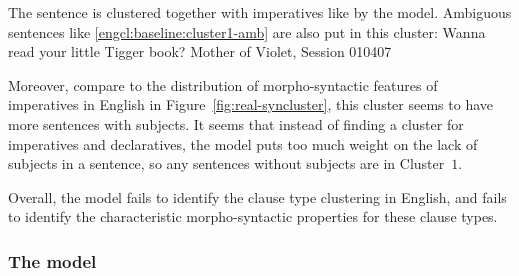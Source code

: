 The sentence is clustered together with imperatives like  by the model. Ambiguous sentences like \ref{engcl:baseline:cluster1-amb} are also put in this cluster:
Wanna read your little Tigger book? \hfill Mother of Violet, Session 010407
\eex

Moreover, compare to the distribution of morpho-syntactic features of imperatives in English in Figure~\ref{fig:real-syncluster}, this cluster seems to have more sentences with subjects. It seems that instead of finding a cluster for imperatives and declaratives, the model puts too much weight on the lack of subjects in a sentence, so any sentences without subjects are in Cluster~$1$. 

Overall, the \dlearnerabbr{} model fails to identify the clause type clustering in English, and fails to identify the characteristic morpho-syntactic properties for these clause types. 


\subsubsection{The \plearnerabbr{} model}
\label{sec:engcl:model:results:p}

